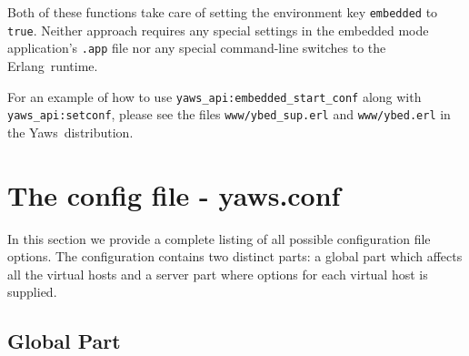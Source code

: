 \documentclass[11pt,oneside,english]{book}
\newcommand{\Erlang}            %
        {{\sc Erlang}}
\newcommand{\Yaws}            %
        {{\sc Yaws}}
\begin{document}
Both of these functions take care of setting the environment key
\verb+embedded+ to \verb+true+. Neither approach requires any special
settings in the embedded mode application's \verb+.app+ file nor any
special command-line switches to the \Erlang\  runtime.

For an example of how to use \verb+yaws_api:embedded_start_conf+ along
with \verb+yaws_api:setconf+, please see the files
\verb+www/ybed_sup.erl+ and \verb+www/ybed.erl+ in the
\Yaws\  distribution.

\chapter{The config file - yaws.conf}

In this section we provide a complete listing of all possible
configuration file options.  The configuration contains two distinct
parts: a global part which affects all the virtual hosts and a server
part where options for each virtual host is supplied.

\section{Global Part}
\end{document}
